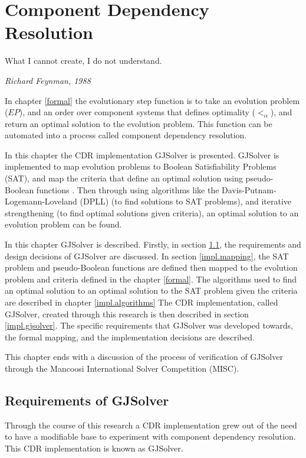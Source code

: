 \chapter{Component Dependency Resolution}
\label{implementation}
\epigraph{What I cannot create, I do not understand.}
{\textit{Richard Feynman, 1988}}

In chapter \ref{formal} the evolutionary step function is to take an evolution problem ($EP$), and an order over component systems that defines optimality ($<_{\alpha}$), 
and return an optimal solution to the evolution problem.
This function can be automated into a process called component dependency resolution.

In this chapter the CDR implementation GJSolver is presented.
GJSolver is implemented to map evolution problems to Boolean Satisfiability Problems (SAT),
and map the criteria that define an optimal solution using pseudo-Boolean functions \citep{dixon2004automating}. 
Then through using algorithms like the Davis-Putnam-Logemann-Loveland (DPLL) \citep{Davis1960, davis1962machine} (to find solutions to SAT problems),
and iterative strengthening \citep{calistri1994iterative, le2010sat4j} (to find optimal solutions given criteria),
an optimal solution to an evolution problem can be found.

In this chapter GJSolver is described.
Firstly, in section \ref{impl.requirement}, the requirements and design decisions of GJSolver are discussed.
In section \ref{impl.mapping}, the SAT problem and pseudo-Boolean functions are defined then mapped to the evolution problem and criteria defined in the chapter \ref{formal}.
The algorithms used to find an optimal solution to an optimal solution to the SAT problem given the criteria are described in chapter \ref{impl.algorithms}
The CDR implementation, called GJSolver, created through this research is then described in section \ref{impl.gjsolver}.
The specific requirements that GJSolver was developed towards, the formal mapping, and the implementation decisions are described.

This chapter ends with a discussion of the process of verification of GJSolver through the Mancoosi International Solver Competition (MISC).  

\section{Requirements of GJSolver}
\label{impl.requirement}
Through the course of this research a CDR implementation grew out of the need to have a modifiable base to experiment with component dependency resolution.
This CDR implementation is known as GJSolver. 

